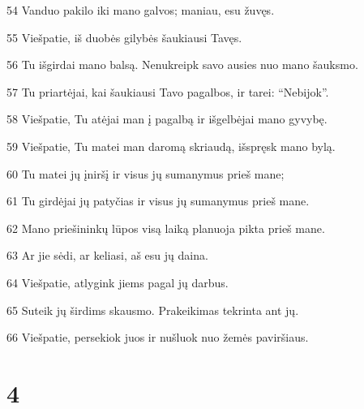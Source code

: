 \par 54 Vanduo pakilo iki mano galvos; maniau, esu žuvęs. 
\par 55 Viešpatie, iš duobės gilybės šaukiausi Tavęs. 
\par 56 Tu išgirdai mano balsą. Nenukreipk savo ausies nuo mano šauksmo. 
\par 57 Tu priartėjai, kai šaukiausi Tavo pagalbos, ir tarei: “Nebijok”. 
\par 58 Viešpatie, Tu atėjai man į pagalbą ir išgelbėjai mano gyvybę. 
\par 59 Viešpatie, Tu matei man daromą skriaudą, išspręsk mano bylą. 
\par 60 Tu matei jų įniršį ir visus jų sumanymus prieš mane; 
\par 61 Tu girdėjai jų patyčias ir visus jų sumanymus prieš mane. 
\par 62 Mano priešininkų lūpos visą laiką planuoja pikta prieš mane. 
\par 63 Ar jie sėdi, ar keliasi, aš esu jų daina. 
\par 64 Viešpatie, atlygink jiems pagal jų darbus. 
\par 65 Suteik jų širdims skausmo. Prakeikimas tekrinta ant jų. 
\par 66 Viešpatie, persekiok juos ir nušluok nuo žemės paviršiaus.



\chapter{4}


